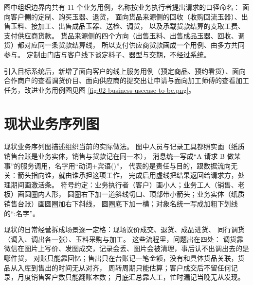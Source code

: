 

\noindent
图中组织边界内共有 11 个业务用例，名称按业务执行者提出请求的口径命名：
面向客户侧的定制、购买玉器、退货，
面向货品来源侧的回收（收购回流玉器）、出售玉料、接加工、出售成品玉器、送检、调货，
以及承载货款结算的支取工费、支付供应商货款。
货品来源侧的四个方向（出售玉料、出售成品玉器、回收、调货）都对应同一条货款结算线，
所以支付供应商货款画成一个用例、由多方共同参与。
定制由门店与客户线下谈定料子、器型与交期，不经过系统。

引入目标系统后，新增了面向客户的线上服务用例（预定商品、预约看货）、面向合作商户的查看调货价目、面向供应商的提交出让申请与面向加工师傅的查看加工任务，改进业务用例图见图 \ref{fig:02-business-usecase-to-be.png}。


\section{现状业务序列图}

现状业务序列图描述组织当前的实际做法。
图中人员与记录工具都照实画（纸质销售台账是业务实体，销售与货款记在同一本），
消息统一写成“A 请求 B 做某事”的服务调用，名字用“动词+宾语()”，
代表的是责任与目的，跟数据流向无关：箭头指向谁，就由谁承担这项工作，
完成后用虚线把结果返回给请求方，处理期间画激活条。
符号约定：业务执行者（客户）画小人；业务工人（销售、老板）画圆圈内人形，
圆圈右下加一道斜线切口、顶部带小箭头；业务实体（纸质销售台账）画圆圈加右下斜线，
圆圈底下加一横；对象名统一写成加粗下划线的“:名字”。

现状的日常经营拆成场景逐一定格：现场议价成交、退货、成品进货、
同行调货（调入、调出各一张）、玉料采购与加工。
这些流程里，问题出在四处：
调货靠微信在图片上写价、发图成交，记录会丢、图片会被清理，事后认不出调出去的是哪件货，
对账只能靠回忆；售出只在台账记一笔金额，没有和具体货品关联，货品从入库到售出的时间无从对齐，
周转周期只能估算；客户成交后不留任何记录，月度销售客户数只能翻账本数；
月底汇总靠人工，忙时漏记当晚无从发现。



